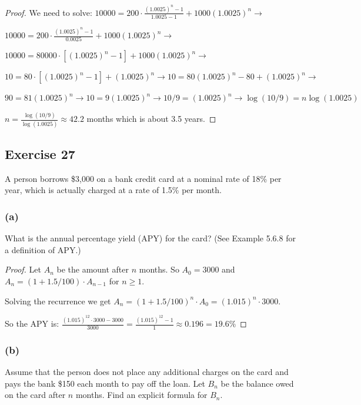 \documentclass[14pt]{extarticle}
\newcommand{\dps}{\displaystyle}
\begin{document}
\begin{proof}
We need to solve:
\(10000 = \dps 200 \cdot \frac{(1.0025)^n - 1}{1.0025 - 1} + 1000(1.0025)^n \to\)

\(10000 = \dps 200 \cdot \frac{(1.0025)^n - 1}{0.0025} + 1000(1.0025)^n \to\)

\(10000 = \dps 80000 \cdot [(1.0025)^n - 1] + 1000(1.0025)^n \to\)

\(10 = 80 \cdot [(1.0025)^n - 1] + (1.0025)^n \to 10 = 80 (1.0025)^n - 80 + (1.0025)^n \to\)

\(90 = 81 (1.0025)^n \to 10 = 9 (1.0025)^n \to 10/9 = (1.0025)^n \to \log(10/9) = n \log(1.0025)\)

\(\dps n = \frac{\log(10/9)}{\log(1.0025)} \approx 42.2\) months which is about 3.5 years.
\end{proof}

\subsection{Exercise 27}
A person borrows \$3,000 on a bank credit card at a nominal 
rate of 18\% per year, which is actually charged at a rate of 1.5\% per month.

\subsubsection{(a)}
What is the annual percentage yield (APY) for the card? (See Example 5.6.8 for a definition of APY.)

\begin{proof}
Let $A_n$ be the amount after $n$ months. So \(A_0 = 3000\) and \(A_n = (1 + 1.5/100) \cdot A_{n-1}\) for \(n \geq 1\).

Solving the recurrence we get \(A_n = (1 + 1.5/100)^n \cdot A_0 = (1.015)^n \cdot 3000.\)

So the APY is: \(\dps \frac{(1.015)^{12} \cdot 3000 - 3000}{3000} = 
\frac{(1.015)^{12} - 1}{1} \approx 0.196 =  19.6\%\)
\end{proof}

\subsubsection{(b)}
Assume that the person does not place any additional charges on the card and pays the bank \$150 each month to pay off the loan. Let $B_n$ be the balance owed on the card after $n$ months. Find an explicit formula for $B_n$.
\end{document}
